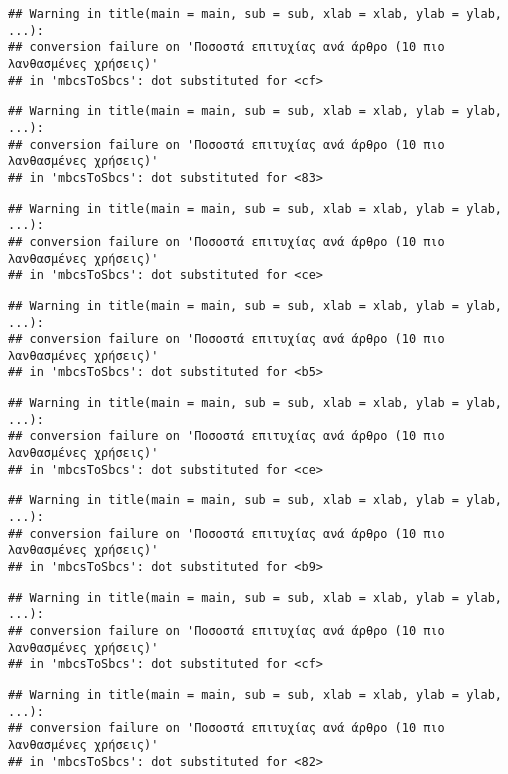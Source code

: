 \documentclass[
]{article}
\begin{document}
\begin{verbatim}
## Warning in title(main = main, sub = sub, xlab = xlab, ylab = ylab, ...):
## conversion failure on 'Ποσοστά επιτυχίας ανά άρθρο (10 πιο λανθασμένες χρήσεις)'
## in 'mbcsToSbcs': dot substituted for <cf>
\end{verbatim}

\begin{verbatim}
## Warning in title(main = main, sub = sub, xlab = xlab, ylab = ylab, ...):
## conversion failure on 'Ποσοστά επιτυχίας ανά άρθρο (10 πιο λανθασμένες χρήσεις)'
## in 'mbcsToSbcs': dot substituted for <83>
\end{verbatim}

\begin{verbatim}
## Warning in title(main = main, sub = sub, xlab = xlab, ylab = ylab, ...):
## conversion failure on 'Ποσοστά επιτυχίας ανά άρθρο (10 πιο λανθασμένες χρήσεις)'
## in 'mbcsToSbcs': dot substituted for <ce>
\end{verbatim}

\begin{verbatim}
## Warning in title(main = main, sub = sub, xlab = xlab, ylab = ylab, ...):
## conversion failure on 'Ποσοστά επιτυχίας ανά άρθρο (10 πιο λανθασμένες χρήσεις)'
## in 'mbcsToSbcs': dot substituted for <b5>
\end{verbatim}

\begin{verbatim}
## Warning in title(main = main, sub = sub, xlab = xlab, ylab = ylab, ...):
## conversion failure on 'Ποσοστά επιτυχίας ανά άρθρο (10 πιο λανθασμένες χρήσεις)'
## in 'mbcsToSbcs': dot substituted for <ce>
\end{verbatim}

\begin{verbatim}
## Warning in title(main = main, sub = sub, xlab = xlab, ylab = ylab, ...):
## conversion failure on 'Ποσοστά επιτυχίας ανά άρθρο (10 πιο λανθασμένες χρήσεις)'
## in 'mbcsToSbcs': dot substituted for <b9>
\end{verbatim}

\begin{verbatim}
## Warning in title(main = main, sub = sub, xlab = xlab, ylab = ylab, ...):
## conversion failure on 'Ποσοστά επιτυχίας ανά άρθρο (10 πιο λανθασμένες χρήσεις)'
## in 'mbcsToSbcs': dot substituted for <cf>
\end{verbatim}

\begin{verbatim}
## Warning in title(main = main, sub = sub, xlab = xlab, ylab = ylab, ...):
## conversion failure on 'Ποσοστά επιτυχίας ανά άρθρο (10 πιο λανθασμένες χρήσεις)'
## in 'mbcsToSbcs': dot substituted for <82>
\end{verbatim}
\end{document}

